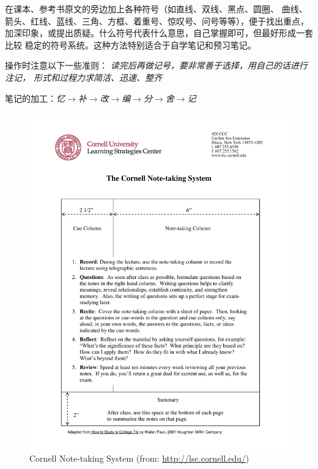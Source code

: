 在课本、参考书原文的旁边加上各种符号（如直线、双线、黑点、圆圈、
曲线、箭头、红线、蓝线、三角、方框、着重号、惊叹号、问号等等），便于找出重点，
加深印象，或提出质疑。什么符号代表什么意思，自己掌握即可，但最好形成一套比较
稳定的符号系统。这种方法特别适合于自学笔记和预习笔记。

操作时注意以下一些准则：
{\it 读完后再做记号，要非常善于选择，用自己的话进行注记，
形式和过程力求简洁、迅速、整齐}

笔记的加工：{\it 忆$\to$补$\to$改$\to$编$\to$分$\to$舍$\to$记}	

\newpage

\begin{figure}[t]
	\centering
	\includegraphics[width=\textwidth]{./Images/Ch00/Cornell-NTS/Cornell-NoteTaking-System.pdf}
	\caption{Cornell Note-taking System (from: \href{http://lsc.cornell.edu/notes.html}{http://lsc.cornell.edu/})}
\end{figure}

\thispagestyle{empty}